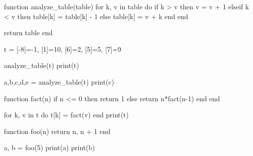 function analyze_table(table) 
    for k, v in table do
        if k > v then
            v = v + 1
        elseif k < v then
            table[k] = table[k] - 1
        else 
            table[k] = v + k
        end
    end

    return table
end

t = {[-8]=-1, [1]=10, [6]=2, [5]=5, [7]=9}

analyze_table(t)
print(t)

a,b,c,d,e = analyze_table(t)
print(c)

function fact(n)
    if n <= 0 then 
        return 1
    else 
        return n*fact(n-1)
    end
end

for k, v in t do
    t[k] = fact(v)
end
print(t)

function foo(n)
    return n, n + 1
end

a, b = foo(5)
print(a)
print(b)